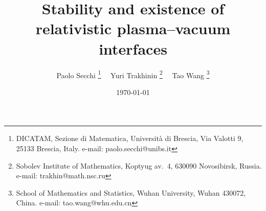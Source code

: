 \documentclass[twoside,11pt]{article}
\numberwithin{equation}{section}
\begin{document}
	\title{\bf Stability and existence of relativistic plasma--vacuum interfaces\let\thefootnote\relax{}
	}
	
	
	\author{
		{\sc Paolo Secchi}%
		\thanks{DICATAM, Sezione di Matematica, Universit\`a di Brescia, Via Valotti 9, 25133 Brescia, Italy. e-mail: paolo.secchi@unibs.it}	
		\qquad  \ \
		{\sc Yuri Trakhinin}%
		\thanks{Sobolev Institute of Mathematics, Koptyug av.~4, 630090 Novosibirsk, Russia. e-mail: trakhin@math.nsc.ru}
		\qquad  \ \
		{\sc Tao Wang}%
		\thanks{School of Mathematics and Statistics, Wuhan University, Wuhan 430072, China. e-mail: tao.wang@whu.edu.cn
		}
	}
	
	\vspace{1mm}
	
	\date{\today}
	
	\maketitle
	
	
	\vspace{-4mm}
	
\end{document}
